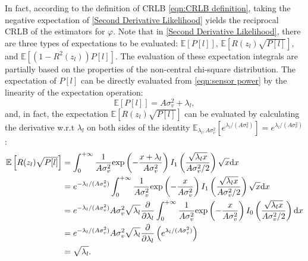 \documentclass[12pt,draftclsnofoot,journal,onecolumn]{IEEEtran}
\theoremstyle{nonumberplain}
\def \exp {\text{exp}}
\begin{document}
\begin{IEEEproof}
    In fact, according to the definition of CRLB \eqref{eqn:CRLB definition}, taking the negative expectation of \eqref{Second Derivative Likelihood} yields the reciprocal CRLB of the estimators for $\varphi$. Note that in \eqref{Second Derivative Likelihood}, there are three types of expectations to be evaluated: $\mathbb{E}\left[P[l]\right]$, $\mathbb{E}\left[R(z_l)\sqrt{P[l]}\right]$, and $\mathbb{E}\left[(1-R^2(z_l))P[l]\right]$. The evaluation of these expectation integrals are partially based on the properties of the non-central chi-square distribution. The expectation of $P[l]$ can be directly evaluated from \eqref{eqn:sensor power} by the linearity of the expectation operation:
    \begin{equation}
        \mathbb{E}\left[P[l]\right] = A\sigma_v^2 + \lambda_l,
        \label{eqn:expectation of P_l}
    \end{equation}
    and, in fact, the expectation $\mathbb{E}\left[R(z_l) \sqrt{P[l]}\right]$ can be evaluated by calculating the derivative w.r.t $\lambda_l$ on both sides of the identity $\mathbb{E}_{\lambda_l, A\sigma_v^2}[e^{\lambda_l/(A\sigma_v^2)}]=e^{\lambda_l/(A\sigma_v^2)}$:
    \begin{equation}
        \begin{aligned}
            \mathbb{E}\left[R(z_l) \sqrt{P[l]}\right] & = \int_{0}^{+\infty}{\frac{1}{A\sigma_v^2}\exp\left(-\frac{x+\lambda_l}{A\sigma_v^2}\right)I_1\left(\frac{\sqrt{\lambda_l x}}{A\sigma_v^2/2}\right)\sqrt{x}{\rm d}x}\\
            & = e^{-\lambda_l/(A\sigma_v^2)}\int_{0}^{+\infty}{\frac{1}{A\sigma_v^2}\exp\left(-\frac{x}{A\sigma_v^2}\right)I_1\left(\frac{\sqrt{\lambda_l x}}{A\sigma_v^2/2}\right)\sqrt{x}{\rm d}x} \\
            & = e^{-\lambda_l/(A\sigma_v^2)} A\sigma_v^2 \sqrt{\lambda_l} \frac{\partial}{\partial\lambda_l} \int_{0}^{+\infty}{\frac{1}{A\sigma_v^2}\exp\left(-\frac{x}{A\sigma_v^2}\right)I_0\left(\frac{\sqrt{\lambda_l x}}{A\sigma_v^2/2}\right) {\rm d}x}\\
            & = e^{-\lambda_l/(A\sigma_v^2)} A\sigma_v^2 \sqrt{\lambda_l} \frac{\partial}{\partial\lambda_l} \left(e^{\lambda_l/(A\sigma_v^2)}\right)\\
            & = \sqrt{\lambda_l}.\\
        \end{aligned}
        \label{eqn:expectation_second_kind_1}
    \end{equation}

\end{IEEEproof}
\end{document}

